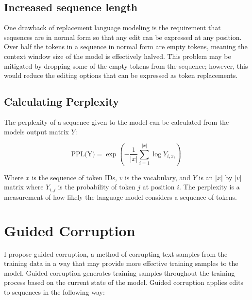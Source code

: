 \documentclass{article}
\begin{document}
\subsection{Increased sequence length}
One drawback of replacement language modeling is the requirement that sequences are in normal form so that any edit can be expressed at any position. Over half the tokens in a sequence in normal form are empty tokens, meaning the context window size of the model is effectively halved. This problem may be mitigated by dropping some of the empty tokens from the sequence; however, this would reduce the editing options that can be expressed as token replacements.


\subsection{Calculating Perplexity}

The perplexity of a sequence given to the model can be calculated from the models output matrix $Y$:

\begin{equation}
    \text{PPL(Y)} = \exp\left(-\frac{1}{|x|} \sum_{i=1}^{|x|} \log Y_{i, x_i}\right)
\end{equation}

Where $x$ is the sequence of token IDs, $v$ is the vocabulary, and $Y$ is an $|x|$ by $|v|$ matrix where $Y_{i, j}$ is the probability of token $j$ at position $i$. The perplexity is a measurement of how likely the language model considers a sequence of tokens.


\section{Guided Corruption}
I propose guided corruption, a method of corrupting text samples from the training data in a way that may provide more effective training samples to the model. Guided corruption generates training samples throughout the training process based on the current state of the model. Guided corruption applies edits to sequences in the following way:
\end{document}
